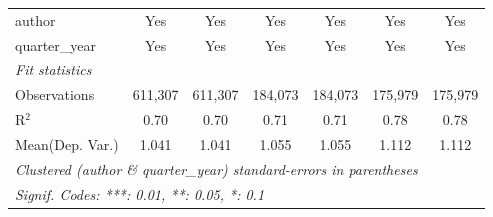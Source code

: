 \begin{tabular}{lcccccc}
   author                                & Yes            & Yes            & Yes            & Yes            & Yes            & Yes\\  
   quarter\_year                         & Yes            & Yes            & Yes            & Yes            & Yes            & Yes\\  
   \midrule
   \emph{Fit statistics}\\
   Observations                          & 611,307        & 611,307        & 184,073        & 184,073        & 175,979        & 175,979\\  
   R$^2$                                 & 0.70           & 0.70           & 0.71           & 0.71           & 0.78           & 0.78\\  
Mean(Dep. Var.) & 1.041 & 1.041 & 1.055 & 1.055 & 1.112 & 1.112 \\
   \midrule \midrule
   \multicolumn{7}{l}{\emph{Clustered (author \& quarter\_year) standard-errors in parentheses}}\\
   \multicolumn{7}{l}{\emph{Signif. Codes: ***: 0.01, **: 0.05, *: 0.1}}\\
\end{tabular}
\par\endgroup
